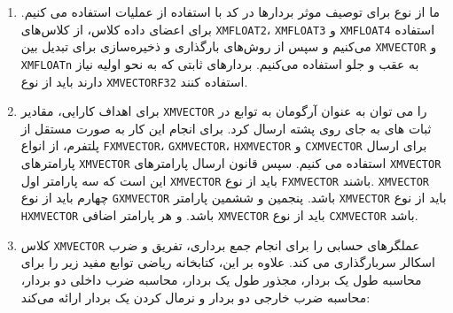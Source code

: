 {\begin{spacing}{1.5}
\begin{enumerate}[label=\textbf{\arabic*}.]
            \item {ما از نوع  برای توصیف موثر بردارها در کد با استفاده از عملیات  استفاده می کنیم.
            برای اعضای داده کلاس، از کلاس‌های \texttt{XMFLOAT2}، \texttt{XMFLOAT3} و \texttt{XMFLOAT4} استفاده می‌کنیم و
            سپس از روش‌های بارگذاری و ذخیره‌سازی برای تبدیل بین \texttt{XMVECTOR} و \texttt{XMFLOATn} به عقب و جلو استفاده می‌کنیم.
            بردارهای ثابتی که به نحو اولیه نیاز دارند باید از نوع \texttt{XMVECTORF32} استفاده کنند.}
            \\
            \item {برای اهداف کارایی، مقادیر \texttt{XMVECTOR} را می توان به عنوان آرگومان به توابع در ثبات های  به جای روی پشته ارسال کرد.
            برای انجام این کار به صورت مستقل از پلتفرم، از انواع \texttt{FXMVECTOR}، \texttt{GXMVECTOR}، \texttt{HXMVECTOR} و \texttt{CXMVECTOR} برای ارسال پارامترهای \texttt{XMVECTOR} استفاده می کنیم.
            سپس قانون ارسال پارامترهای \texttt{XMVECTOR} این است که سه پارامتر اول \texttt{XMVECTOR} باید از نوع \texttt{FXMVECTOR} باشند. \texttt{XMVECTOR} چهارم باید از نوع \texttt{GXMVECTOR} باشد.
            پنجمین و ششمین پارامتر \texttt{XMVECTOR} باید از نوع \texttt{HXMVECTOR} باشد. و هر پارامتر اضافی \texttt{XMVECTOR} باید از نوع \texttt{CXMVECTOR} باشد.}
            \\
            \item {کلاس \texttt{XMVECTOR} عملگرهای حسابی را برای انجام جمع برداری، تفریق و ضرب اسکالر سربارگذاری می کند.
            علاوه بر این، کتابخانه ریاضی  توابع مفید زیر را برای محاسبه طول یک بردار، مجذور طول یک بردار، محاسبه ضرب داخلی دو بردار، محاسبه ضرب خارجی دو بردار و نرمال کردن یک بردار ارائه می‌کند:
            \textbf{\vspace{6pt}}
            \lr{}
            }
        \end{enumerate}
    \end{spacing}
}
\newpage

